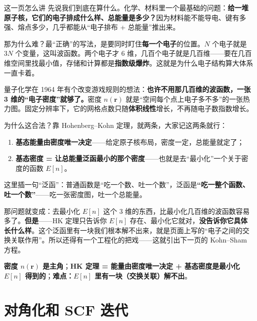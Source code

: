 \documentclass[11pt, a4paper, fontset=none]{ctexart}
\newcommand{\hl}[1]{{\color{key}\bfseries #1}}
\begin{document}
\begin{say}{这一页怎么讲}
先说我们到底在算什么。化学、材料里一个最基础的问题：\textbf{给一堆原子核，它们的电子排成什么样、总能量是多少？}因为材料能不能导电、键有多强、熔点多少，几乎都能从“电子排布 + 总能量”推出来。

那为什么难？最“正确”的写法，是要同时盯住\textbf{每一个电子}的位置。$N$ 个电子就是 $3N$ 个变量，这叫波函数。两个电子才 6 维，几百个电子就是几百维——要在几百维空间里找最小值，存储和计算都是\hl{指数级爆炸}。这就是为什么电子结构算大体系一直卡着。

量子化学在 1964 年有个改变游戏规则的想法：\textbf{也许不用那几百维的波函数，一张 3 维的“电子密度”就够了。}密度 $n(\mathbf r)$ 就是“空间每个点上电子多不多”的一张热力图。固定分辨率下，它的网格点数只随\textbf{体积线性}增长，不再随电子数指数增长。

为什么这合法？靠 Hohenberg–Kohn 定理，就两条，大家记这两条就行：
\begin{enumerate}[leftmargin=*]
  \item \textbf{基态能量由密度唯一决定}——给定原子核布局，密度一定，总能量就定了；
  \item \textbf{基态密度 = 让总能量泛函最小的那个密度}——也就是去“最小化”一个关于密度的函数 $E[n]$。
\end{enumerate}

这里插一句“泛函”：普通函数是“吃一个数、吐一个数”，泛函是\hl{“吃一整个函数、吐一个数”}——吃一张密度图，吐一个总能量。

那问题就变成：去最小化 $E[n]$ 这个 3 维的东西，比最小化几百维的波函数容易多了。\textbf{但是}——HK 定理只告诉你 $E[n]$ 存在、最小化它就对，\hl{没告诉你它具体长什么样}。这个泛函里有一块我们根本解不出来，就是页面上写的“电子之间的交换关联作用”。所以还得有一个工程化的把戏——这就引出下一页的 Kohn–Sham 方程。
\end{say}

\begin{say}[title={这一页的关键词（如果被打断，回扣这三点）}]
\textbf{密度 $n(\mathbf r)$ 是主角}；\textbf{HK 定理 = 能量由密度唯一决定 + 基态密度是最小化 $E[n]$ 得到的}；\textbf{难点：$E[n]$ 里有一块（交换关联）解不出}。
\end{say}

\section{对角化和 SCF 迭代}\label{sec:s3}
\end{document}
